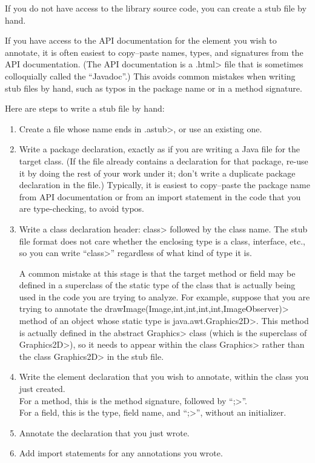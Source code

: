 

If you do not have access to the library source code, you can create a stub
file by hand.

If you have access to the API documentation for the element you wish to
annotate, it is often easiest to copy--paste names, types, and signatures
from the API documentation.  (The API documentation is a \<.html> file that
is sometimes colloquially called the ``Javadoc''.)  This avoids common
mistakes when writing stub files by hand, such as typos in the package name
or in a method signature.


Here are steps to write a stub file by hand:
\begin{enumerate}
\item Create a file whose name ends in \<.astub>, or use an existing one.
\item Write a package declaration, exactly as if you are
writing a Java file for the target class.  (If the file already contains a
declaration for that package, re-use it by doing the rest of your work
under it; don't write a duplicate package declaration in the file.)
Typically, it is easiest to copy--paste the package name from API
documentation or from an import statement in the code that you are
type-checking, to avoid typos.
\item Write a class declaration header:  \<class> followed by the
class name. The stub file format does not care whether the enclosing type
is a class, interface, etc., so you can write ``\<class>'' regardless of
what kind of type it is.

A common mistake at this stage is that the
target method or field may be defined in a superclass of the static type of
the class that is actually being used in the code you are trying to
analyze. For example, suppose that you are trying to annotate the
\<drawImage(Image,int,int,int,int,ImageObserver)> method of an object whose static
type is \<java.awt.Graphics2D>\@.  This method is actually defined in the abstract
\<Graphics> class (which is the superclass of \<Graphics2D>), so it needs
to appear within the class \<Graphics> rather than the class \<Graphics2D>
in the stub file.
\item Write the element declaration that you wish to annotate, within the class you just created.  \\
For a method, this is the method signature, followed by ``\<;>''. \\
For a field, this is the type, field name, and ``\<;>'', without an initializer.
\item Annotate the declaration that you just wrote.
\item Add import statements for any annotations you wrote.
\end{enumerate}

